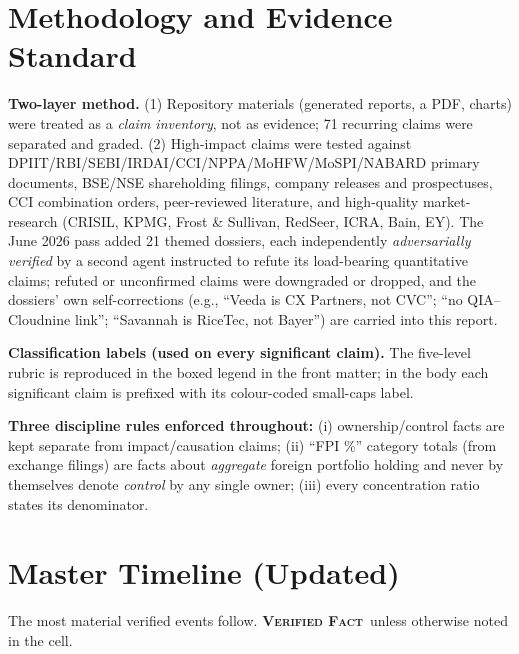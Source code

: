 \documentclass[11pt,a4paper]{article}
\newcommand{\VF}{\textcolor{vfcol}{\textsc{\textbf{Verified Fact}}}}
\begin{document}
\section{Methodology and Evidence Standard}
\textbf{Two-layer method.} (1) Repository materials (generated reports, a PDF, charts) were treated as a \emph{claim inventory}, not as evidence; 71 recurring claims were separated and graded. (2) High-impact claims were tested against DPIIT/RBI/SEBI/IRDAI/CCI/NPPA/MoHFW/MoSPI/NABARD primary documents, BSE/NSE shareholding filings, company releases and prospectuses, CCI combination orders, peer-reviewed literature, and high-quality market-research (CRISIL, KPMG, Frost \& Sullivan, RedSeer, ICRA, Bain, EY). The June 2026 pass added 21 themed dossiers, each independently \emph{adversarially verified} by a second agent instructed to refute its load-bearing quantitative claims; refuted or unconfirmed claims were downgraded or dropped, and the dossiers' own self-corrections (e.g., ``Veeda is CX Partners, not CVC''; ``no QIA--Cloudnine link''; ``Savannah is RiceTec, not Bayer'') are carried into this report.

\textbf{Classification labels (used on every significant claim).} The five-level rubric is reproduced in the boxed legend in the front matter; in the body each significant claim is prefixed with its colour-coded small-caps label.

\textbf{Three discipline rules enforced throughout:} (i) ownership/control facts are kept separate from impact/causation claims; (ii) ``FPI \%'' category totals (from exchange filings) are facts about \emph{aggregate} foreign portfolio holding and never by themselves denote \emph{control} by any single owner; (iii) every concentration ratio states its denominator.

\section{Master Timeline (Updated)}
The most material verified events follow. \VF\ unless otherwise noted in the cell.
\end{document}
